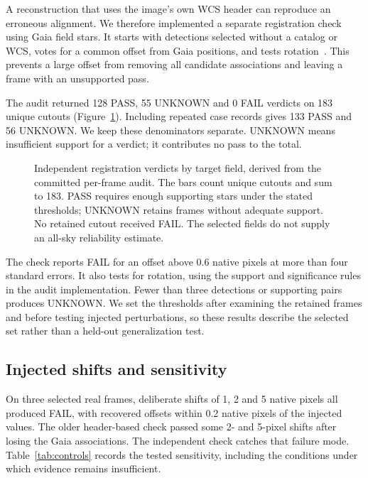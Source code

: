 \documentclass[11pt,letterpaper]{article}
\begin{document}
A reconstruction that uses the image's own WCS header can reproduce an erroneous alignment. We therefore implemented a separate registration check using Gaia field stars. It starts with detections selected without a catalog or WCS, votes for a common offset from Gaia positions, and tests rotation~\cite{registration}. This prevents a large offset from removing all candidate associations and leaving a frame with an unsupported pass.

The audit returned 128 PASS, 55 UNKNOWN and 0 FAIL verdicts on 183 unique cutouts (Figure~\ref{fig:registration}). Including repeated case records gives 133 PASS and 56 UNKNOWN. We keep these denominators separate. UNKNOWN means insufficient support for a verdict; it contributes no pass to the total.

\begin{figure}[htbp]
 \centering
 
 \caption{Independent registration verdicts by target field, derived from the committed per-frame audit. The bars count unique cutouts and sum to 183. PASS requires enough supporting stars under the stated thresholds; UNKNOWN retains frames without adequate support. No retained cutout received FAIL. The selected fields do not supply an all-sky reliability estimate.}
 \label{fig:registration}
\end{figure}

The check reports FAIL for an offset above 0.6 native pixels at more than four standard errors. It also tests for rotation, using the support and significance rules in the audit implementation. Fewer than three detections or supporting pairs produces UNKNOWN. We set the thresholds after examining the retained frames and before testing injected perturbations, so these results describe the selected set rather than a held-out generalization test.

\subsection{Injected shifts and sensitivity}
On three selected real frames, deliberate shifts of 1, 2 and 5 native pixels all produced FAIL, with recovered offsets within 0.2 native pixels of the injected values. The older header-based check passed some 2- and 5-pixel shifts after losing the Gaia associations. The independent check catches that failure mode. Table~\ref{tab:controls} records the tested sensitivity, including the conditions under which evidence remains insufficient.
\end{document}
